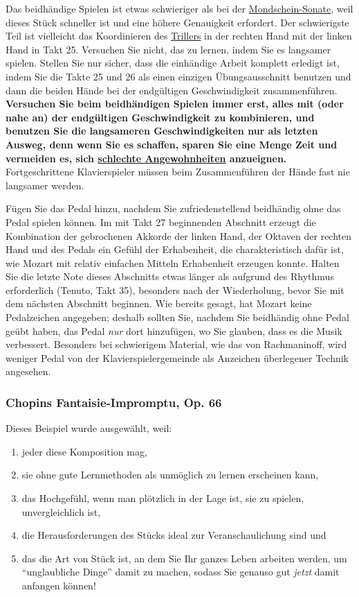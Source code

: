 Das beidhändige Spielen ist etwas schwieriger als bei der \hyperref[c1ii25b]{Mondschein-Sonate}, weil dieses Stück schneller ist und eine höhere Genauigkeit erfordert.
Der schwierigste Teil ist vielleicht das Koordinieren des \hyperref[c1iii3]{Trillers} in der rechten Hand mit der linken Hand in Takt 25.
Versuchen Sie nicht, das zu lernen, indem Sie es langsamer spielen.
Stellen Sie nur sicher, dass die einhändige Arbeit komplett erledigt ist, indem Sie die Takte 25 und 26 als einen einzigen Übungsausschnitt benutzen und dann die beiden Hände bei der endgültigen Geschwindigkeit zusammenführen.
\textbf{Versuchen Sie beim beidhändigen Spielen immer erst, alles mit (oder nahe an) der endgültigen Geschwindigkeit zu kombinieren, 
und benutzen Sie die langsameren Geschwindigkeiten nur als letzten Ausweg, denn wenn Sie es schaffen, sparen Sie eine Menge Zeit und vermeiden es, sich \hyperref[c1ii22]{schlechte Angewohnheiten} anzueignen.}
Fortgeschrittene Klavierspieler müssen beim Zusammenführen der Hände fast nie langsamer werden.

Fügen Sie das Pedal hinzu, nachdem Sie zufriedenstellend beidhändig ohne das Pedal spielen können.
Im mit Takt 27 beginnenden Abschnitt erzeugt die Kombination der gebrochenen Akkorde der linken Hand, der Oktaven der rechten Hand und des Pedals ein Gefühl der Erhabenheit, die charakteristisch dafür ist, wie Mozart mit relativ einfachen Mitteln Erhabenheit erzeugen konnte.
Halten Sie die letzte Note dieses Abschnitts etwas länger als aufgrund des Rhythmus erforderlich (Tenuto, Takt 35), besonders nach der Wiederholung, bevor Sie mit dem nächsten Abschnitt beginnen.
Wie bereits gesagt, hat Mozart keine Pedalzeichen angegeben; deshalb sollten Sie, nachdem Sie beidhändig ohne Pedal geübt haben, das Pedal \textit{nur} dort hinzufügen, wo Sie glauben, dass es die Musik verbessert.
Besonders bei schwierigem Material, wie das von Rachmaninoff, wird weniger Pedal von der Klavierspielergemeinde als Anzeichen überlegener Technik angesehen.


\label{FI}
\subsubsection{Chopins Fantaisie-Impromptu, Op. 66}
\label{c1ii25d}

Dieses Beispiel wurde ausgewählt, weil:

\begin{enumerate}[label={\arabic*.}] 
 \item jeder diese Komposition mag,
 \item sie ohne gute Lernmethoden als unmöglich zu lernen erscheinen kann,
 \item das Hochgefühl, wenn man plötzlich in der Lage ist, sie zu spielen, unvergleichlich ist,
 \item die Herausforderungen des Stücks ideal zur Veranschaulichung sind und
 \item das die Art von Stück ist, an dem Sie Ihr ganzes Leben arbeiten werden, um \enquote{unglaubliche Dinge} damit zu machen, sodass Sie genauso gut \textit{jetzt} damit anfangen können!
\end{enumerate}

